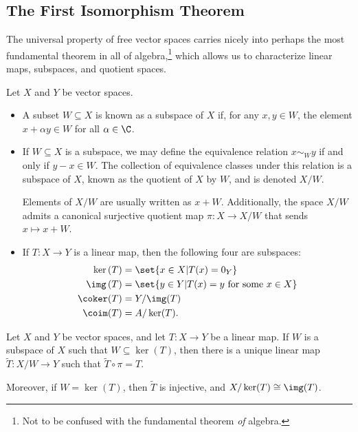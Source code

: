 \subsection{The First Isomorphism Theorem}%
The universal property of free vector spaces carries nicely into perhaps the most fundamental theorem in all of algebra,\footnote{Not to be confused with the fundamental theorem \textit{of} algebra.} which allows us to characterize linear maps, subspaces, and quotient spaces.
\begin{definition}
  Let $X$ and $Y$ be vector spaces.
  \begin{itemize}
    \item A subset $W\subseteq X$ is known as a subspace of $X$ if, for any $x,y\in W$, the element $x + \alpha y\in W$ for all $\alpha \in \C$.
    \item If $W\subseteq X$ is a subspace, we may define the equivalence relation $x \sim_{W} y$ if and only if $y-x \in W$. The collection of equivalence classes under this relation is a subspace of $X$, known as the quotient of $X$ by $W$, and is denoted $X/W$.\newline

      Elements of $X/W$ are usually written as $x + W$. Additionally, the space $X/W$ admits a canonical surjective quotient map $\pi\colon X\rightarrow X/W$ that sends $x\mapsto x + W$.
    \item If $T\colon X\rightarrow Y$ is a linear map, then the following four are subspaces:
      \begin{align*}
        \ker\left(T\right) &= \set{x\in X | T(x) = 0_Y}\\
        \img\left(T\right) &= \set{y\in Y | T(x) = y\text{ for some }x\in X}\\
        \coker(T) &= Y/\img(T)\\
        \coim(T) &= A/\ker(T).
      \end{align*}
  \end{itemize}
\end{definition}
\begin{theorem}
  Let $X$ and $Y$ be vector spaces, and let $T\colon X\rightarrow Y$ be a linear map. If $W$ is a subspace of $X$ such that $W\subseteq \ker(T)$, then there is a unique linear map $\widetilde{T}\colon X/W \rightarrow Y$ such that $\widetilde{T}\circ \pi = T$.\newline

  Moreover, if $W = \ker(T)$, then $\widetilde{T}$ is injective, and $X/\ker(T)\cong \img(T)$.
\end{theorem}
